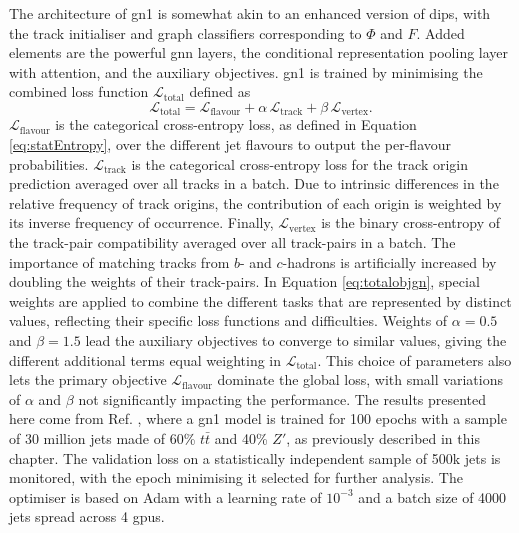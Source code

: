 The architecture of \gls{gn1} is somewhat akin to an enhanced version of \gls{dips}, with the track initialiser and graph classifiers corresponding to $\Phi$ and $F$. Added elements are the powerful \gls{gnn} layers, the conditional representation pooling layer with attention, and the auxiliary objectives. \gls{gn1} is trained by  minimising the combined loss function $\mathcal{L}_{\textrm{total}}$ defined as 
\begin{equation}\label{eq:totalobjgn}
  \mathcal{L}_{\textrm{total}} = \mathcal{L}_{\textrm{flavour}} + \alpha \, \mathcal{L}_{\textrm{track}} + \beta \, \mathcal{L}_{\textrm{vertex}}.
\end{equation}
$\mathcal{L}_{\textrm{flavour}}$ is the categorical cross-entropy loss, as defined in Equation \ref{eq:statEntropy}, over the different jet flavours to output the per-flavour probabilities. $\mathcal{L}_{\textrm{track}}$ is the categorical cross-entropy loss for the track origin prediction averaged over all tracks in a batch. Due to intrinsic differences in the relative frequency of track origins, the contribution of each origin is weighted by its inverse frequency of occurrence. Finally, $\mathcal{L}_{\textrm{vertex}}$ is the binary cross-entropy of the track-pair compatibility averaged over all track-pairs in a batch. The importance of matching tracks from $b$- and $c$-hadrons is artificially increased by doubling the weights of their track-pairs. In Equation \ref{eq:totalobjgn}, special weights are applied to combine the different tasks that are represented by distinct values, reflecting their specific loss functions and difficulties. Weights of $\alpha = 0.5$ and $\beta = 1.5$ \cite{ATL-PHYS-PUB-2022-027} lead the auxiliary objectives to converge to similar values, giving the different additional terms equal weighting in $\mathcal{L}_{\textrm{total}}$. This choice of parameters also lets the primary objective $\mathcal{L}_{\textrm{flavour}}$ dominate the global loss, with small variations of $\alpha$ and $\beta$ not significantly impacting the performance. The results presented here come from Ref. \cite{ATL-PHYS-PUB-2022-027}, where a \gls{gn1} model is trained for 100 epochs with a sample of 30 million jets made of 60\% $t\bar{t}$ and 40\% $Z'$, as previously described in this chapter. The validation loss on a statistically independent sample of 500k jets is monitored, with the epoch minimising it selected for further analysis. The optimiser is based on Adam \cite{adamPaper} with a learning rate of $10^{-3}$ and a batch size of 4000 jets spread across 4 \glspl{gpu}. \\


